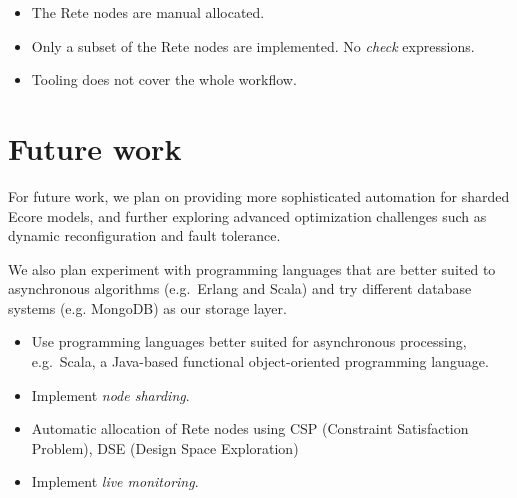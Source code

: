 \begin{itemize}
  \item The Rete nodes are manual allocated.
  \item Only a subset of the Rete nodes are implemented. No \emph{check} expressions. 
  \item Tooling does not cover the whole workflow.   
\end{itemize}

\section{Future work}
\label{sec:future-work}

For future work, we plan on providing more sophisticated automation for sharded Ecore models, and further exploring advanced optimization challenges such as dynamic reconfiguration and fault tolerance.

We also plan experiment with programming languages that are better suited to asynchronous algorithms (e.g.\ Erlang and Scala) and try different database systems (e.g. MongoDB) as our storage layer.

\begin{itemize}
  \item Use programming languages better suited for asynchronous processing, e.g.\ Scala, a Java-based functional object-oriented programming language.
  \item Implement \emph{node sharding}.
  \item Automatic allocation of Rete nodes using CSP (Constraint Satisfaction Problem), DSE (Design Space Exploration) \cite{DSE11}
  \item Implement \emph{live monitoring}. 
\end{itemize}
